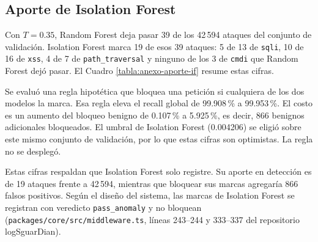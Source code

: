 \subsection{Aporte de Isolation Forest}

Con $T = 0.35$, Random Forest deja pasar 39 de los 42\,594 ataques del conjunto de validación. Isolation Forest marca 19 de esos 39 ataques: 5 de 13 de \texttt{sqli}, 10 de 16 de \texttt{xss}, 4 de 7 de \texttt{path\_traversal} y ninguno de los 3 de \texttt{cmdi} que Random Forest dejó pasar. El Cuadro \ref{tabla:anexo-aporte-if} resume estas cifras.

Se evaluó una regla hipotética que bloquea una petición si cualquiera de los dos modelos la marca. Esa regla eleva el recall global de 99.908\,\% a 99.953\,\%. El costo es un aumento del bloqueo benigno de 0.107\,\% a 5.925\,\%, es decir, 866 benignos adicionales bloqueados. El umbral de Isolation Forest (0.004206) se eligió sobre este mismo conjunto de validación, por lo que estas cifras son optimistas. La regla no se desplegó.

Estas cifras respaldan que Isolation Forest solo registre. Su aporte en detección es de 19 ataques frente a 42\,594, mientras que bloquear sus marcas agregaría 866 falsos positivos. Según el diseño del sistema, las marcas de Isolation Forest se registran con veredicto \texttt{pass\_anomaly} y no bloquean (\texttt{packages/core/src/middleware.ts}, líneas 243--244 y 333--337 del repositorio logSguarDian).

